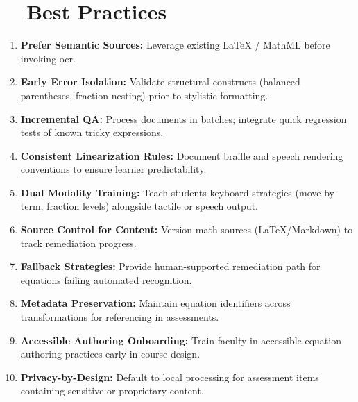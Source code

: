 \section{~~Best Practices}\label{ch11:sec:best-practices}
\begin{enumerate}
	\item \textbf{Prefer Semantic Sources:} Leverage existing LaTeX / \gls{MathML} before invoking \gls{ocr}.
	\item \textbf{Early Error Isolation:} Validate structural constructs (balanced parentheses, fraction nesting) prior to stylistic formatting.
	\item \textbf{Incremental QA:} Process documents in batches; integrate quick regression tests of known tricky expressions.
	\item \textbf{Consistent Linearization Rules:} Document braille and speech rendering conventions to ensure learner predictability.
	\item \textbf{Dual Modality Training:} Teach students keyboard  strategies (move by term, fraction levels) alongside tactile or speech output.
	\item \textbf{Source Control for Content:} Version math sources (LaTeX/Markdown) to track remediation progress.
	\item \textbf{Fallback Strategies:} Provide human-supported remediation path for equations failing automated recognition.
	\item \textbf{Metadata Preservation:} Maintain equation identifiers across transformations for referencing in assessments.
	\item \textbf{Accessible Authoring Onboarding:} Train faculty in accessible equation authoring practices early in course design.
	\item \textbf{Privacy-by-Design:} Default to local processing for assessment items containing sensitive or proprietary content.\supercite{DataPrivacyAI}
\end{enumerate}

